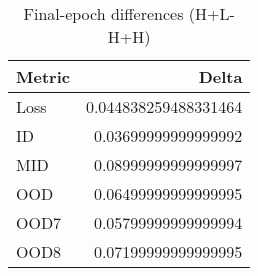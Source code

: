 \begin{table}[t]
\centering
\begin{tabular}{lr}
\hline
Metric & Delta \\
\hline
Loss & 0.044838259488331464 \\
ID & 0.03699999999999992 \\
MID & 0.08999999999999997 \\
OOD & 0.06499999999999995 \\
OOD7 & 0.05799999999999994 \\
OOD8 & 0.07199999999999995 \\
\hline
\end{tabular}
\caption{Final-epoch differences (H+L-H+H)}
\label{tab:diff}
\end{table}
